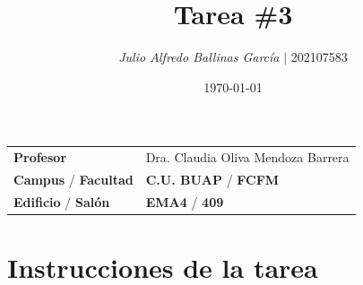 \documentclass{article}
\title{\textcolor{Apple Green}{\textbf{Tarea}} \textcolor{Sun}{\textbf{\#}}\textcolor{Cinnabar}{\textbf{3}}}
\author{\emph{Julio Alfredo Ballinas García} $\boldsymbol{\mid}$ 202107583}
\date{\today}
\begin{document}
\maketitle



\begin{mybox}
\noindent\begin{tabular}{@{}ll}
	{\bfseries{Profesor}} & Dra. Claudia Oliva Mendoza Barrera\\
	\textcolor{prussianblue}{\bfseries{Campus}} / \textcolor{trueblue}{\bfseries{Facultad}}  & \textcolor{prussianblue}{\bfseries{C.U. BUAP}} /  \textcolor{trueblue}{\bfseries{FCFM}} \\
	\textcolor{prussianblue}{\bfseries{Edificio}} /  \textcolor{trueblue}{\bfseries{Salón}}    & 	\textcolor{prussianblue}{\bfseries{EMA4}} /  \textcolor{trueblue}{\bfseries{409}}   
\end{tabular} 
\end{mybox} \vspace{1cm}

\section{Instrucciones de la tarea}
\end{document}
